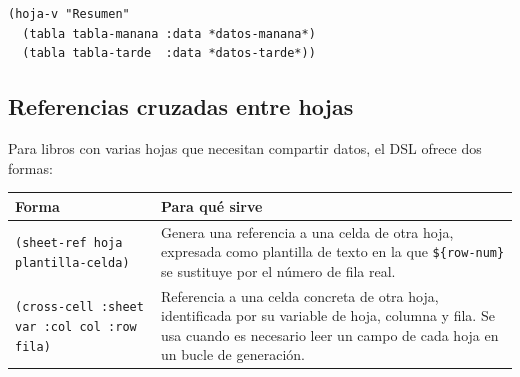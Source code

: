 \documentclass[12pt,a4paper]{report}
\begin{document}
\begin{lstlisting}
(hoja-v "Resumen"
  (tabla tabla-manana :data *datos-manana*)
  (tabla tabla-tarde  :data *datos-tarde*))
\end{lstlisting}

\subsection*{Referencias cruzadas entre hojas}

Para libros con varias hojas que necesitan compartir datos, el DSL ofrece
dos formas:

\begin{center}
\begin{tabular}{lp{8cm}}
\toprule
\textbf{Forma} & \textbf{Para qué sirve} \\
\midrule
\texttt{(sheet-ref hoja plantilla-celda)} & Genera una referencia a una
  celda de otra hoja, expresada como plantilla de texto en la que
  \texttt{\$\{row-num\}} se sustituye por el número de fila real. \\
\texttt{(cross-cell :sheet var :col col :row fila)} & Referencia a una celda
  concreta de otra hoja, identificada por su variable de hoja, columna y fila.
  Se usa cuando es necesario leer un campo de cada hoja en un bucle de
  generación. \\
\bottomrule
\end{tabular}
\end{center}
\end{document}
